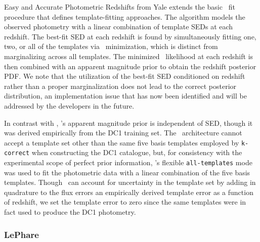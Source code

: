 Easy and Accurate Photometric Redshifts from Yale \citep[\eazy\footnote{\url{https://github.com/gbrammer/eazy-photoz}},][]{brammer_eazy:_2008} extends the basic \chisq\ fit procedure that defines template-fitting approaches.
The algorithm models the observed photometry with a linear combination of template SEDs at each redshift.
The best-fit SED at each redshift is found by simultaneously fitting one, two, or all of the templates via \chisq\ minimization, which is distinct from marginalizing across all templates.
The minimized \chisq\ likelihood at each redshift is then combined with an apparent magnitude prior to obtain the redshift posterior PDF.
We note that the utilization of the best-fit SED conditioned on redshift rather than a proper marginalization does not lead to the correct posterior distribution, an implementation issue that has now been identified and will be addressed by the developers in the future.

In contrast with \bpz, \eazy's apparent magnitude prior is independent of SED, though it was derived empirically from the DC1 training set.
The \eazy\ architecture cannot accept a template set other than the same five basis templates employed by \texttt{k-correct} when constructing the DC1 catalogue, but, for consistency with the experimental scope of perfect prior information, \eazy's flexible \texttt{all-templates} mode was used to fit the photometric data with a linear combination of the five basis templates.
Though \eazy\ can account for uncertainty in the template set by adding in quadrature to the flux errors an empirically derived template error as a function of redshift, we set the template error to zero since the same templates were in fact used to produce the DC1 photometry.

\subsubsection{LePhare}

